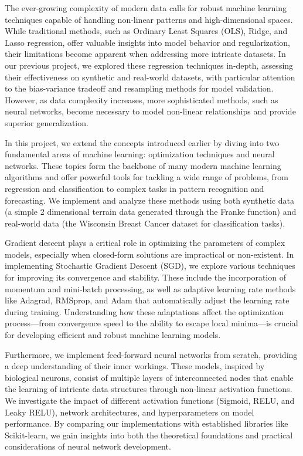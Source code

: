 
The ever-growing complexity of modern data calls for robust machine learning techniques capable of handling non-linear patterns and high-dimensional spaces. While traditional methods, such as Ordinary Least Squares (OLS), Ridge, and Lasso regression, offer valuable insights into model behavior and regularization, their limitations become apparent when addressing more intricate datasets. In our previous project, we explored these regression techniques in-depth, assessing their effectiveness on synthetic and real-world datasets, with particular attention to the bias-variance tradeoff and resampling methods for model validation. However, as data complexity increases, more sophisticated methods, such as neural networks, become necessary to model non-linear relationships and provide superior generalization.

In this project, we extend the concepts introduced earlier by diving into two fundamental areas of machine learning: optimization techniques and neural networks. These topics form the backbone of many modern machine learning algorithms and offer powerful tools for tackling a wide range of problems, from regression and classification to complex tasks in pattern recognition and forecasting. We implement and analyze these methods using both synthetic data (a simple 2 dimensional terrain data generated through the Franke function) and real-world data (the Wisconsin Breast Cancer dataset for classification tasks).

Gradient descent plays a critical role in optimizing the parameters of complex models, especially when closed-form solutions are impractical or non-existent. In implementing Stochastic Gradient Descent (SGD), we explore various techniques for improving its convergence and stability. These include the incorporation of momentum and mini-batch processing, as well as adaptive learning rate methods like Adagrad, RMSprop, and Adam that automatically adjust the learning rate during training. Understanding how these adaptations affect the optimization process—from convergence speed to the ability to escape local minima—is crucial for developing efficient and robust machine learning models.

Furthermore, we implement feed-forward neural networks from scratch, providing a deep understanding of their inner workings. These models, inspired by biological neurons, consist of multiple layers of interconnected nodes that enable the learning of intricate data structures through non-linear activation functions. We investigate the impact of different activation functions (Sigmoid, RELU, and Leaky RELU), network architectures, and hyperparameters on model performance. By comparing our implementations with established libraries like Scikit-learn, we gain insights into both the theoretical foundations and practical considerations of neural network development.

